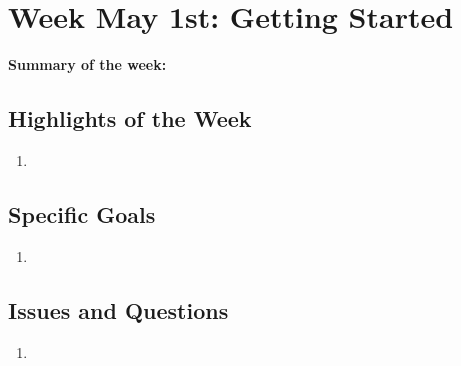 \documentclass[12pt]{article}
\begin{document}

\clearpage

\section*{Week May 1st: Getting Started}

\textbf{Summary of the week:}

\subsection*{Highlights of the Week}
\begin{enumerate}
    \item 
\end{enumerate}

\subsection*{Specific Goals}
\begin{enumerate}
    \item 
\end{enumerate}


\subsection*{Issues and Questions}
\begin{enumerate}
    \item 
\end{enumerate}






\end{document}
